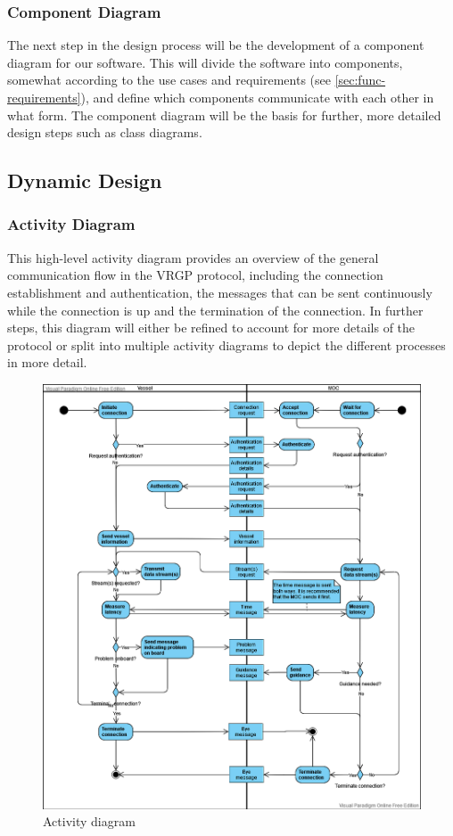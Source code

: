 \subsubsection{Component Diagram}

The next step in the design process will be the development of a component diagram for our software. This will divide the software into components, somewhat according to the use cases and requirements (see \ref{sec:func-requirements}), and define which components communicate with each other in what form. The component diagram will be the basis for further, more detailed design steps such as class diagrams.

\subsection{Dynamic Design}\label{sec:dynamic-design}

\subsubsection{Activity Diagram}

This high-level activity diagram provides an overview of the general communication flow in the VRGP protocol, including the connection establishment and authentication, the messages that can be sent continuously while the connection is up and the termination of the connection. In further steps, this diagram will either be refined to account for more details of the protocol or split into multiple activity diagrams to depict the different processes in more detail.

\begin{figure}[ht]
	\centering
	\includegraphics[width=\linewidth]{diagrams/activity-diagram}
	\caption{Activity diagram}
	\label{fig:activity-diagram}
\end{figure}

